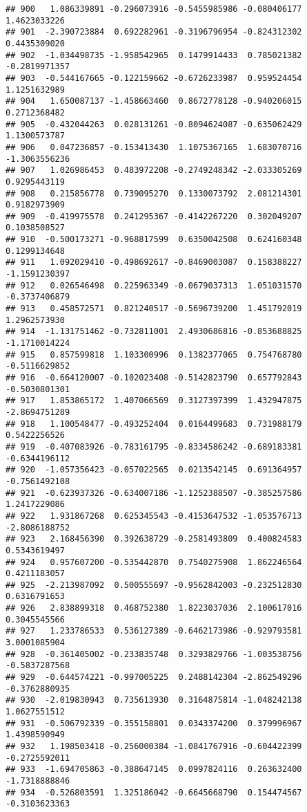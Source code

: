 \documentclass[
]{article}
\begin{document}
\begin{verbatim}
## 900   1.086339891 -0.296073916 -0.5455985986 -0.080406177  1.4623033226
## 901  -2.390723884  0.692282961 -0.3196796954 -0.824312302  0.4435309020
## 902  -1.034498735 -1.958542965  0.1479914433  0.785021382 -0.2819971357
## 903  -0.544167665 -0.122159662 -0.6726233987  0.959524454  1.1251632989
## 904   1.650087137 -1.458663460  0.8672778128 -0.940206015  0.2712368482
## 905  -0.432044263  0.028131261 -0.8094624087 -0.635062429  1.1300573787
## 906   0.047236857 -0.153413430  1.1075367165  1.683070716 -1.3063556236
## 907   1.026986453  0.483972208 -0.2749248342 -2.033305269  0.9295443119
## 908   0.215856778  0.739095270  0.1330073792  2.081214301  0.9182973909
## 909  -0.419975578  0.241295367 -0.4142267220  0.302049207  0.1038508527
## 910  -0.500173271 -0.968817599  0.6350042508  0.624160348  0.1299134648
## 911   1.092029410 -0.498692617 -0.8469003087  0.158388227 -1.1591230397
## 912   0.026546498  0.225963349 -0.0679037313  1.051031570 -0.3737406879
## 913   0.458572571  0.821240517 -0.5696739200  1.451792019  1.2962573930
## 914  -1.131751462 -0.732811001  2.4930686816 -0.853688825 -1.1710014224
## 915   0.857599818  1.103300996  0.1382377065  0.754768780 -0.5116629852
## 916  -0.664120007 -0.102023408 -0.5142823790  0.657792843 -0.5030801301
## 917   1.853865172  1.407066569  0.3127397399  1.432947875 -2.8694751289
## 918   1.100548477 -0.493252404  0.0164499683  0.731988179  0.5422256526
## 919  -0.407083926 -0.783161795 -0.8334586242 -0.689183381 -0.6344196112
## 920  -1.057356423 -0.057022565  0.0213542145  0.691364957 -0.7561492108
## 921  -0.623937326 -0.634007186 -1.1252388507 -0.385257586  1.2417229086
## 922   1.931867268  0.625345543 -0.4153647532 -1.053576713 -2.8086188752
## 923   2.168456390  0.392638729 -0.2581493809  0.400824583  0.5343619497
## 924   0.957607200 -0.535442870  0.7540275908  1.862246564  0.4211183057
## 925  -2.213987092  0.500555697 -0.9562842003 -0.232512830  0.6316791653
## 926   2.838899318  0.468752380  1.8223037036  2.100617016  0.3045545566
## 927   1.233786533  0.536127389 -0.6462173986 -0.929793581  3.0001085904
## 928  -0.361405002 -0.233835748  0.3293829766 -1.003538756 -0.5837287568
## 929  -0.644574221 -0.997005225  0.2488142304 -2.862549296 -0.3762880935
## 930  -2.019830943  0.735613930  0.3164875814 -1.048242138  1.0627551512
## 931  -0.506792339 -0.355158801  0.0343374200  0.379996967  1.4398590949
## 932   1.198503418 -0.256000384 -1.0841767916 -0.604422399 -0.2725592011
## 933  -1.694705863 -0.388647145  0.0997824116  0.263632400 -1.7318888846
## 934  -0.526803591  1.325186042 -0.6645668790  0.154474567 -0.3103623363

\end{verbatim}
\end{document}
